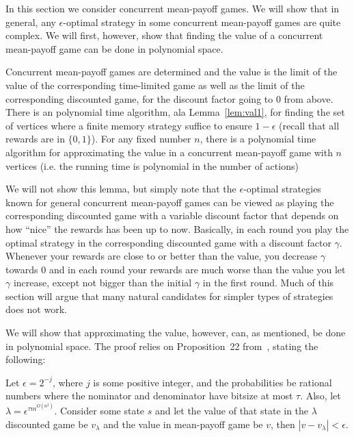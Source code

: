 In this section we consider concurrent mean-payoff games. 
We will show that in general, any  $\epsilon$-optimal strategy in some concurrent mean-payoff games are quite complex. 
We will first, however, show that finding the value of a concurrent mean-payoff game can be done in polynomial space.

\begin{lemma}\label{lemm:class_meanpayoff}
Concurrent mean-payoff games are determined and the value is the limit of the value of the corresponding time-limited game as well as the limit of the corresponding discounted game, for the discount factor going to 0 from above.
There is an polynomial time algorithm, ala Lemma~\ref{lem:val1}, for finding the set of vertices where a finite memory strategy suffice to ensure $1-\epsilon$ (recall that all rewards are in $\{0,1\}$).
For any fixed number $n$, there is a polynomial time algorithm for approximating the value in a concurrent mean-payoff game with $n$ vertices (i.e. the running time is polynomial in the number of actions)
\end{lemma}
We will not show this lemma, but simply note that the $\epsilon$-optimal strategies known for general concurrent mean-payoff games  can be viewed as playing the corresponding discounted game with a variable discount factor that depends on how ``nice'' the rewards has been up to now. Basically, in each round you play the optimal strategy in the corresponding discounted game with a discount factor $\gamma$. Whenever 
 your rewards are close to or better than the value, you decrease $\gamma$ towards 0 and in each round your rewards are much worse than the value you let $\gamma$ increase, except not bigger than the initial $\gamma$ in the first round. Much of this section will argue that many natural candidates for simpler types of strategies does not work.


We will show that approximating the value, however, can, as mentioned, be done in polynomial space. The proof relies on Proposition~22 from~\cite{HKLMT:2011}, stating the following:
\begin{proposition}
Let $\epsilon=2^{-j}$, where $j$ is some positive integer, and the probabilities be rational numbers where the nominator and denominator have bitsize at most $\tau$. Also, let $\lambda=\epsilon^{\tau m^{O(n^2)}}$. Consider some state $s$ and let the value of that state in the $\lambda$ discounted game be $v_{\lambda}$ and the value in mean-payoff game be $v$, then $|v-v_{\lambda}|<\epsilon$.
\end{proposition}

